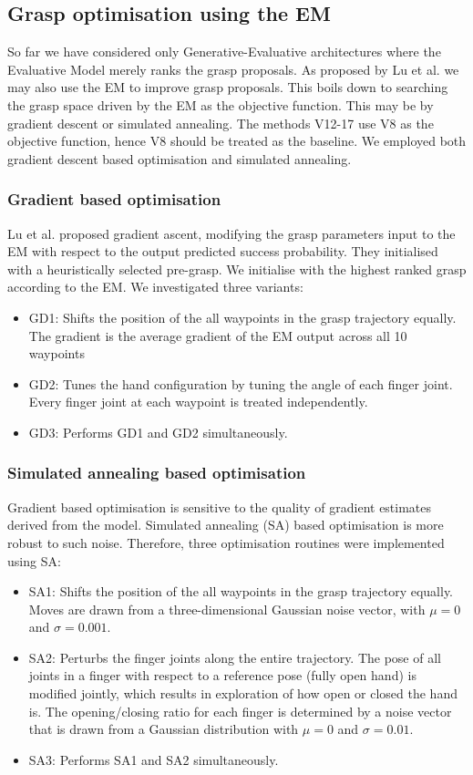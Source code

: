 \subsection{Grasp optimisation using the EM}

So far we have considered only Generative-Evaluative architectures where the Evaluative Model merely ranks the grasp proposals. As proposed by Lu et al. \cite{lu2017planning} we may also use the EM to improve grasp proposals. This boils down to searching the grasp space driven by the EM as the objective function. This may be by gradient descent or simulated annealing. The methods V12-17 use V8 as the objective function, hence V8 should be treated as the baseline. We employed both gradient descent based optimisation and simulated annealing.

\subsubsection{Gradient based optimisation}
Lu et al. \cite{lu2017planning} proposed gradient ascent, modifying the grasp parameters input to the EM with respect to the output predicted success probability. They initialised with a heuristically selected pre-grasp. We initialise with the highest ranked grasp according to the EM. We investigated three variants:
\begin{itemize}
\item GD1: Shifts the position of the all waypoints in the grasp trajectory equally. The gradient is the average gradient of the EM output across all 10 waypoints
\item GD2: Tunes the hand configuration by tuning the angle of each finger joint. Every finger joint at each waypoint is treated independently.
\item GD3: Performs GD1 and GD2 simultaneously.
\end{itemize}

\subsubsection{Simulated annealing based optimisation}
Gradient based optimisation is sensitive to the quality of gradient estimates derived from the model. Simulated annealing (SA) based optimisation is more robust to such noise. Therefore, three optimisation routines were implemented using SA:
\begin{itemize}
\item SA1: Shifts the position of the all waypoints in the grasp trajectory equally. Moves are drawn from a three-dimensional Gaussian noise vector, with $\mu=0$ and $\sigma=0.001$. 
\item SA2: Perturbs the finger joints along the entire trajectory. The pose of all joints in a finger with respect to a reference pose (fully open hand) is modified jointly, which results in exploration of how open or closed the hand is. The opening/closing ratio for each finger is determined by a noise vector that is drawn from a Gaussian distribution with $\mu=0$ and $\sigma=0.01$. 
\item SA3: Performs SA1 and SA2 simultaneously.
\end{itemize}